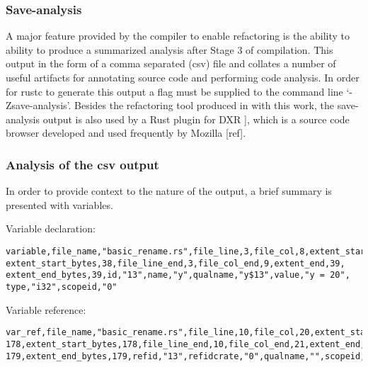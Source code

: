 \subsubsection{Save-analysis}
A major feature provided by the compiler to enable refactoring is the ability to ability to produce a summarized analysis after Stage 3 of compilation. This output in the form of a comma separated (csv) file and collates a number of useful artifacts for annotating source code and performing code analysis. In order for rustc to generate this output a flag must be supplied to the command line `-Zsave-analysis'. Besides the refactoring tool produced in with this work, the save-analysis output is also used by a Rust plugin for DXR ], which is a source code browser developed and used frequently by Mozilla [ref].  


\subsubsection{Analysis of the csv output}
In order to provide context to the nature of the output, a brief summary is presented with variables.

\noindent
Variable declaration:
\begin{verbatim}
variable,file_name,"basic_rename.rs",file_line,3,file_col,8,extent_start,38,
extent_start_bytes,38,file_line_end,3,file_col_end,9,extent_end,39,
extent_end_bytes,39,id,"13",name,"y",qualname,"y$13",value,"y = 20",
type,"i32",scopeid,"0"
\end{verbatim}

\noindent
Variable reference:
\begin{verbatim}
var_ref,file_name,"basic_rename.rs",file_line,10,file_col,20,extent_start,
178,extent_start_bytes,178,file_line_end,10,file_col_end,21,extent_end,
179,extent_end_bytes,179,refid,"13",refidcrate,"0",qualname,"",scopeid,"4"
\end{verbatim}

